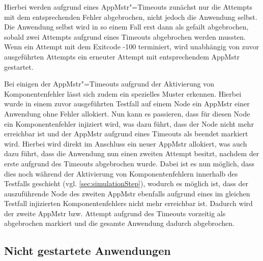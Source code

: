 Hierbei werden aufgrund eines \ac{AppMstr}"=Timeouts zunächst nur die Attempts mit dem entsprechenden Fehler abgebrochen, nicht jedoch die Anwendung selbst.
Die Anwendung selbst wird in so einem Fall erst dann als gefailt abgebrochen, sobald zwei Attempts aufgrund eines Timeouts abgebrochen werden mussten.
Wenn ein Attempt mit dem Exitcode -100 terminiert, wird unabhängig von zuvor ausgeführten Attempts ein erneuter Attempt mit entsprechendem \ac{AppMstr} gestartet.

Bei einigen der \ac{AppMstr}"=Timeouts aufgrund der Aktivierung von Komponentenfehler lässt sich zudem ein spezielles Muster erkennen.
Hierbei wurde in einem zuvor ausgeführten Testfall auf einem Node ein \ac{AppMstr} einer Anwendung ohne Fehler allokiert.
Nun kann es passieren, dass für diesen Node ein Komponentenfehler injiziert wird, was dazu führt, dass der Node nicht mehr erreichbar ist und der \ac{AppMstr} aufgrund eines Timeouts als beendet markiert wird.
Hierbei wird direkt im Anschluss ein neuer \ac{AppMstr} allokiert, was auch dazu führt, dass die Anwendung nun einen zweiten Attempt besitzt, nachdem der erste aufgrund des Timeouts abgebrochen wurde.
Dabei ist es nun möglich, dass dies noch während der Aktivierung von Komponentenfehlern innerhalb des Testfalls geschieht (vgl. \autoref{sec:simulationStep}), wodurch es möglich ist, dass der auszuführende Node des zweiten \ac{AppMstr} ebenfalls aufgrund eines im gleichen Testfall injizierten Komponentenfehlers nicht mehr erreichbar ist.
Dadurch wird der zweite \ac{AppMstr} bzw. Attempt aufgrund des Timeouts vorzeitig als abgebrochen markiert und die gesamte Anwendung dadurch abgebrochen.

\subsection{Nicht gestartete Anwendungen}
\label{sec:notStartedApps}

